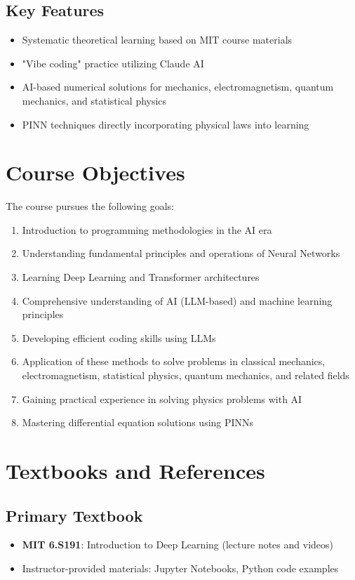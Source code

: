 \documentclass[11pt,a4paper]{article}
\begin{document}
\subsection*{Key Features}
\begin{itemize}[noitemsep]
    \item Systematic theoretical learning based on MIT course materials
    \item "Vibe coding" practice utilizing Claude AI
    \item AI-based numerical solutions for mechanics, electromagnetism, quantum mechanics, and statistical physics
    \item PINN techniques directly incorporating physical laws into learning
\end{itemize}

\section{Course Objectives}

The course pursues the following goals:

\begin{enumerate}[noitemsep]
    \item Introduction to programming methodologies in the AI era
    \item Understanding fundamental principles and operations of Neural Networks
    \item Learning Deep Learning and Transformer architectures
    \item Comprehensive understanding of AI (LLM-based) and machine learning principles
    \item Developing efficient coding skills using LLMs
    \item Application of these methods to solve problems in classical mechanics, electromagnetism, statistical physics, quantum mechanics, and related fields
    \item Gaining practical experience in solving physics problems with AI
    \item Mastering differential equation solutions using PINNs
\end{enumerate}

\section{Textbooks and References}

\subsection{Primary Textbook}
\begin{itemize}[noitemsep]
    \item \textbf{MIT 6.S191}: Introduction to Deep Learning (lecture notes and videos)
    \item Instructor-provided materials: Jupyter Notebooks, Python code examples
\end{itemize}
\end{document}
